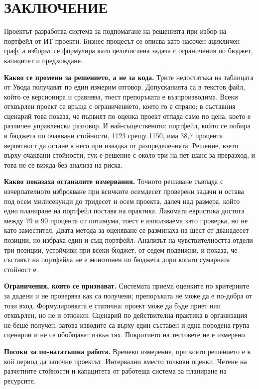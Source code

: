 \section*{ЗАКЛЮЧЕНИЕ}
\label{sec:conclusion}

Проектът разработва система за подпомагане на решенията при избор на портфейл от
ИТ проекти. Бизнес процесът се описва като насочен ацикличен граф, а изборът се
формулира като целочислена задача с ограничения по бюджет, капацитет и
предхождане.

\textbf{Какво се промени за решението, а не за кода.} Трите недостатъка на
таблицата от Увода получават по един измерим отговор. Допусканията са в текстов
файл, който се версионира и сравнява, тоест препоръката е възпроизводима. Всеки
отхвърлен проект се връща с ограничението, което го е спряло; в съставния
сценарий това показа, че първият по оценка проект отпада само по цена, което е
различен управленски разговор. И най-същественото: портфейл,
който се побира в бюджета по очаквани стойности, 1123 срещу 1150, има 38,7
процента вероятност да остане в него при извадка от разпределенията. Решение,
взето върху очаквани стойности, тук е решение с около три на пет шанс за
преразход, и това не се вижда без анализа на риска.

\textbf{Какво показаха останалите измервания.} Точното решаване съвпада с
изчерпателното изброяване при всичките осемдесет проверени задачи и остава под
осем милисекунди до тридесет и осем проекта, далеч над размера, който едно
планиране на портфейл поставя на практика. Лакомата евристика достига между 79 и
90 процента от оптимума, тоест е използваема като проверка, но не като заместител.
Двата метода за оценяване се разминаха на шест от дванадесет позиции, но избраха
един и същ портфейл. Анализът на чувствителността отдели три позиции, устойчиви
при всеки бюджет, от седем подвижни, и показа, че съставът на портфейла не е
монотонен по бюджета дори когато сумарната стойност е.

\textbf{Ограничения, които се признават.} Системата приема оценките по критериите
за дадени и не проверява как са получени; препоръката не може да е по-добра от
този вход. Формулировката е статична: проект може да бъде приет или отхвърлен, но
не и отложен. Сценарий по действителна практика в организация не беше получен,
затова изводите са върху един съставен и една породена група сценарии и не се
обобщават извън тях. Покритието на тестовете не е измерено.

\textbf{Посоки за по-нататъшна работа.} Времево измерение, при което решението е в
кой период да започне проектът. Интервални вместо точкови оценки. Четене на
разчетните стойности и капацитета от работеща система за планиране на ресурсите.
